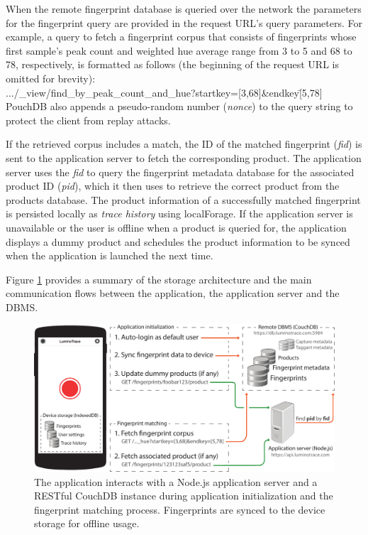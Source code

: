 \documentclass[thesis.tex]{subfiles}
\begin{document}
When the remote fingerprint database is queried over the network the parameters for the fingerprint query are provided in the request URL's query parameters. For example, a query to fetch a fingerprint corpus that consists of fingerprints whose first sample's peak count and weighted hue average range from 3 to 5 and 68 to 78, respectively, is formatted as follows (the beginning of the request URL is omitted for brevity):\\

\colorbox{gray!10} {\quad \small .../\_view/find\_by\_peak\_count\_and\_hue?startkey=[3,68]\&endkey\=[5,78] \quad} \\


\noindent PouchDB also appends a pseudo-random number (\emph{nonce}) to the query string to protect the client from replay attacks.

If the retrieved corpus includes a match, the ID of the matched fingerprint (\emph{fid}) is sent to the application server to fetch the corresponding product. The application server uses the \emph{fid} to query the fingerprint metadata database for the associated product ID (\emph{pid}), which it then uses to retrieve the correct product from the products database. The product information of a successfully matched fingerprint is persisted locally as \emph{trace history} using localForage. If the application server is unavailable or the user is offline when a product is queried for, the application displays a dummy product and schedules the product information to be synced when the application is launched the next time.

Figure \ref{figure:application-database-flow} provides a summary of the storage architecture and the main communication flows between the application, the application server and the DBMS.

\enlargethispage{10\baselineskip}

\begin{figure}[h]
\centering \includegraphics[width=\textwidth,height=\textheight,keepaspectratio=true]{images/design_implementation/application_database_flow}
\caption{The application interacts with a Node.js application server and a RESTful CouchDB instance during application initialization and the fingerprint matching process. Fingerprints are synced to the device storage for offline usage.\label{figure:application-database-flow}}
\end{figure}
\end{document}
